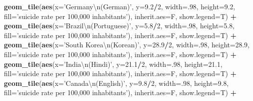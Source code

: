 \documentclass[]{article}
\newenvironment{Shaded}{\begin{snugshade}}{\end{snugshade}}
\newcommand{\CharTok}[1]{\textcolor[rgb]{0.31,0.60,0.02}{#1}}
\newcommand{\DataTypeTok}[1]{\textcolor[rgb]{0.13,0.29,0.53}{#1}}
\newcommand{\DecValTok}[1]{\textcolor[rgb]{0.00,0.00,0.81}{#1}}
\newcommand{\FloatTok}[1]{\textcolor[rgb]{0.00,0.00,0.81}{#1}}
\newcommand{\KeywordTok}[1]{\textcolor[rgb]{0.13,0.29,0.53}{\textbf{#1}}}
\newcommand{\NormalTok}[1]{#1}
\newcommand{\OperatorTok}[1]{\textcolor[rgb]{0.81,0.36,0.00}{\textbf{#1}}}
\newcommand{\StringTok}[1]{\textcolor[rgb]{0.31,0.60,0.02}{#1}}
\begin{document}
\begin{Shaded}
\begin{Highlighting}[]
{{{{{{{{{{{{{{{{{{{{{{{{\StringTok{    }\KeywordTok{geom_tile}\NormalTok{(}\KeywordTok{aes}\NormalTok{(}\DataTypeTok{x=}\StringTok{'Germany}\CharTok{\textbackslash{}n}\StringTok{(German)'}\NormalTok{,     }\DataTypeTok{y=}\FloatTok{9.2}\OperatorTok{/}\DecValTok{2}\NormalTok{,  }\DataTypeTok{width=}\NormalTok{.}\DecValTok{98}\NormalTok{, }\DataTypeTok{height=}\FloatTok{9.2}\NormalTok{, }\DataTypeTok{fill=}\StringTok{'suicide rate per 100,000 inhabitants'}\NormalTok{), }\DataTypeTok{inherit.aes=}\NormalTok{F, }\DataTypeTok{show.legend=}\NormalTok{T) }\OperatorTok{+}
\StringTok{    }\KeywordTok{geom_tile}\NormalTok{(}\KeywordTok{aes}\NormalTok{(}\DataTypeTok{x=}\StringTok{'Brazil}\CharTok{\textbackslash{}n}\StringTok{(Portuguese)'}\NormalTok{,  }\DataTypeTok{y=}\FloatTok{5.8}\OperatorTok{/}\DecValTok{2}\NormalTok{,  }\DataTypeTok{width=}\NormalTok{.}\DecValTok{98}\NormalTok{, }\DataTypeTok{height=}\FloatTok{5.8}\NormalTok{, }\DataTypeTok{fill=}\StringTok{'suicide rate per 100,000 inhabitants'}\NormalTok{), }\DataTypeTok{inherit.aes=}\NormalTok{F, }\DataTypeTok{show.legend=}\NormalTok{T) }\OperatorTok{+}
\StringTok{    }\KeywordTok{geom_tile}\NormalTok{(}\KeywordTok{aes}\NormalTok{(}\DataTypeTok{x=}\StringTok{'South Korea}\CharTok{\textbackslash{}n}\StringTok{(Korean)'}\NormalTok{, }\DataTypeTok{y=}\FloatTok{28.9}\OperatorTok{/}\DecValTok{2}\NormalTok{, }\DataTypeTok{width=}\NormalTok{.}\DecValTok{98}\NormalTok{, }\DataTypeTok{height=}\FloatTok{28.9}\NormalTok{, }\DataTypeTok{fill=}\StringTok{'suicide rate per 100,000 inhabitants'}\NormalTok{), }\DataTypeTok{inherit.aes=}\NormalTok{F, }\DataTypeTok{show.legend=}\NormalTok{T) }\OperatorTok{+}
\StringTok{    }\KeywordTok{geom_tile}\NormalTok{(}\KeywordTok{aes}\NormalTok{(}\DataTypeTok{x=}\StringTok{'India}\CharTok{\textbackslash{}n}\StringTok{(Hindi)'}\NormalTok{,        }\DataTypeTok{y=}\FloatTok{21.1}\OperatorTok{/}\DecValTok{2}\NormalTok{, }\DataTypeTok{width=}\NormalTok{.}\DecValTok{98}\NormalTok{, }\DataTypeTok{height=}\FloatTok{21.1}\NormalTok{, }\DataTypeTok{fill=}\StringTok{'suicide rate per 100,000 inhabitants'}\NormalTok{), }\DataTypeTok{inherit.aes=}\NormalTok{F, }\DataTypeTok{show.legend=}\NormalTok{T) }\OperatorTok{+}
\StringTok{    }\KeywordTok{geom_tile}\NormalTok{(}\KeywordTok{aes}\NormalTok{(}\DataTypeTok{x=}\StringTok{'Canada}\CharTok{\textbackslash{}n}\StringTok{(English)'}\NormalTok{,     }\DataTypeTok{y=}\FloatTok{9.8}\OperatorTok{/}\DecValTok{2}\NormalTok{,  }\DataTypeTok{width=}\NormalTok{.}\DecValTok{98}\NormalTok{, }\DataTypeTok{height=}\FloatTok{9.8}\NormalTok{, }\DataTypeTok{fill=}\StringTok{'suicide rate per 100,000 inhabitants'}\NormalTok{), }\DataTypeTok{inherit.aes=}\NormalTok{F, }\DataTypeTok{show.legend=}\NormalTok{T) }\OperatorTok{+}
}}}}}}}}}}}}}}}}}}}}}}}}
\end{Highlighting}
\end{Shaded}
\end{document}
